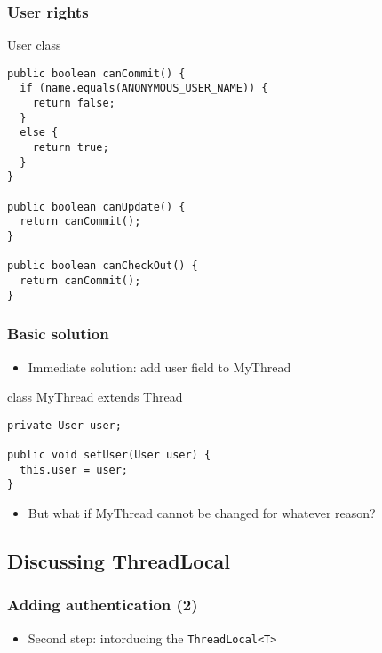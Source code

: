 \documentclass{beamer}
\begin{document}
\begin{frame}[fragile]
  \frametitle{User rights}

\begin{block}{User class}
\begin{verbatim}
public boolean canCommit() {
  if (name.equals(ANONYMOUS_USER_NAME)) {
    return false;
  }
  else {
    return true;
  }
}

public boolean canUpdate() {
  return canCommit();
}

public boolean canCheckOut() {
  return canCommit();
}
\end{verbatim}
\end{block}

\end{frame}

\begin{frame}[fragile]
  \frametitle{Basic solution}

\begin{itemize}
\item Immediate solution: add user field to MyThread
\end{itemize}

\pause

\begin{block}{class MyThread extends Thread}
\begin{verbatim}
private User user;

public void setUser(User user) {
  this.user = user;
}
\end{verbatim}
\end{block}

\pause

\begin{itemize}
\item But what if MyThread cannot be changed for whatever reason?
\end{itemize}

\end{frame}

\subsection{Discussing ThreadLocal}

\begin{frame}
  \frametitle{Adding authentication (2)}

\begin{itemize}
\item Second step: intorducing the \tt{ThreadLocal<T>}
\end{itemize}

\begin{center}
\end{center}

\end{frame}
\end{document}
